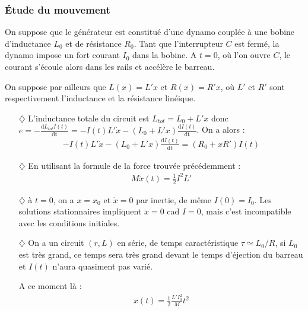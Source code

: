 \documentclass{report}
\begin{document}
\subsubsection*{Étude du mouvement}

On suppose que le générateur est constitué d'une dynamo couplée à une bobine d'inductance $L_0$ et de résistance $R_0$. Tant que l'interrupteur $C$ est fermé, la dynamo impose un fort courant $I_0$ dans la bobine. A $t=0$, où l'on ouvre $C$, le courant s'écoule alors dans les rails et accélère le barreau. 

On suppose par ailleurs que $L(x)=L'x$ et $R(x)=R'x$, où $L'$ et $R'$ sont respectivement l'inductance et la résistance linéique.

\begin{itemize}

	\item[$\diamondsuit$] L'inductance totale du circuit est $L_{tot}=L_0+L'x$ donc $e=-\frac{\mathrm{d}L_{tot}I(t)}{\mathrm{dt}}=-I(t)L'\dot{x}-(L_0+L'x)\frac{\mathrm{d}I(t)}{\mathrm{dt}}$. On a alors :
	\begin{align*}
		-I(t)L'\dot{x}-(L_0+L'x)\frac{\mathrm{d}I(t)}{\mathrm{dt}} = (R_0+xR')I(t)
	\end{align*}
	
	\item[$\diamondsuit$] En utilisant la formule de la force trouvée précédemment :
	\begin{align*}
		M\ddot{x}(t)=\frac{1}{2}I^2L'
	\end{align*}
	
	\item[$\diamondsuit$] à $t=0$, on a $x=x_0$ et $\dot{x}=0$ par inertie, de même $I(0)=I_0$. Les solutions stationnaires impliquent $\ddot{x}=0$ cad $I=0$, mais c'est incompatible avec les conditions initiales. 
	
	\item[$\diamondsuit$] On a un circuit $(r,L)$ en série, de temps caractéristique $\tau\simeq L_0/R$, si $L_0$ est très grand, ce temps sera très grand devant le temps d'éjection du barreau et $I(t)$ n'aura quasiment pas varié. 
	
	A ce moment là :
	\begin{align*}		
		x(t)=\frac{1}{2}\frac{L'I_0^2}{M} t^2	
	\end{align*}

\end{itemize}
\end{document}
